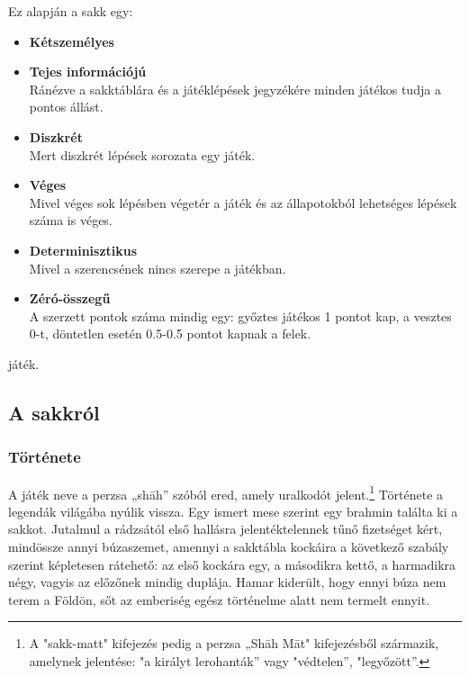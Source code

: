 \documentclass[twoside, a4paper, 12pt]{article}
\begin{document}
Ez alapján a sakk egy:
\begin{itemize}
	\item \textbf{Kétszemélyes}
	
	\item \textbf{Tejes információjú} \\
	Ránézve a sakktáblára és a játéklépések jegyzékére minden játékos tudja a pontos állást.
	
	\item \textbf{Diszkrét} \\
	Mert diszkrét lépések sorozata egy játék.
	
	\item \textbf{Véges} \\
	Mivel véges sok lépésben végetér a játék és az állapotokból lehetséges lépések száma is véges.
	
	\item \textbf{Determinisztikus} \\
	Mivel a szerencsének nincs szerepe a játékban.
	
	\item \textbf{Zéró-összegű} \\
	A szerzett pontok száma mindig egy: győztes játékos 1 pontot kap, a vesztes 0-t, döntetlen esetén 0.5-0.5 pontot kapnak a felek.
\end{itemize}
játék.

\subsection{A sakkról}

\subsubsection{Története}
A játék neve a perzsa „shāh” szóból ered, amely uralkodót jelent.\footnote{A "sakk-matt" kifejezés pedig a perzsa „Shāh Māt" kifejezésből származik, amelynek jelentése: "a királyt lerohanták” vagy "védtelen”, "legyőzött”.\cite{ChessMateHu}\cite{ChessMateEn}} Története a legendák világába nyúlik vissza. Egy ismert mese szerint egy brahmin találta ki a sakkot. Jutalmul a rádzsától első hallásra jelentéktelennek tűnő fizetséget kért, mindössze annyi búzaszemet, amennyi a sakktábla kockáira a következő szabály szerint képletesen rátehető: az első kockára egy, a másodikra kettő, a harmadikra négy, vagyis az előzőnek mindig duplája. Hamar kiderült, hogy ennyi búza nem terem a Földön, sőt az emberiség egész történelme alatt nem termelt ennyit.
\end{document}
